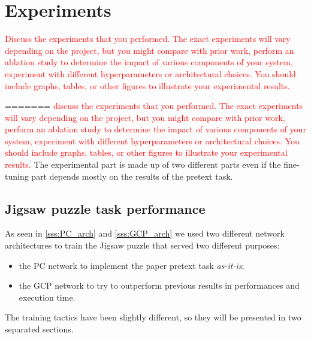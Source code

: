 \section{Experiments}
\textcolor{red}{Discuss the experiments that you performed. The exact experiments will vary depending on the project, but you might compare with prior work, perform an ablation study to determine the impact of various components of your system, experiment with different hyperparameters or architectural choices. You should include graphs, tables, or other figures to illustrate your experimental results.}

=======
\textcolor{red}{discuss the experiments that you performed. The exact experiments will vary depending on the project, but you might compare with prior work, perform an ablation study to determine the impact of various components of your system, experiment with different hyperparameters or architectural choices. You should include graphs, tables, or other figures to illustrate your experimental results.}
The experimental part is made up of two different parts even if the fine-tuning part depends mostly on the results of the pretext task. 


\subsection{Jigsaw puzzle task performance}
As seen in \ref{sss:PC_arch} and \ref{sss:GCP_arch} we used two different network architectures to train the Jigsaw puzzle that served two different purposes:
\begin{itemize}
    \item the PC network to implement the paper pretext task \emph{as-it-is};
    \item the GCP network to try to outperform previous results in performances and execution time.
\end{itemize}
The training tactics have been slightly different, so they will be presented in two separated sections.

